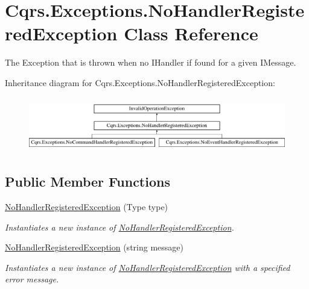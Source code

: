 \hypertarget{classCqrs_1_1Exceptions_1_1NoHandlerRegisteredException}{}\section{Cqrs.\+Exceptions.\+No\+Handler\+Registered\+Exception Class Reference}
\label{classCqrs_1_1Exceptions_1_1NoHandlerRegisteredException}


The Exception that is thrown when no I\+Handler if found for a given I\+Message.  


Inheritance diagram for Cqrs.\+Exceptions.\+No\+Handler\+Registered\+Exception\+:\begin{figure}[H]
\begin{center}
\leavevmode
\includegraphics[height=2.427746cm]{classCqrs_1_1Exceptions_1_1NoHandlerRegisteredException}
\end{center}
\end{figure}
\subsection*{Public Member Functions}
\begin{DoxyCompactItemize}
\item 
\hyperlink{classCqrs_1_1Exceptions_1_1NoHandlerRegisteredException_a573a57a3de0f1f63adc8709708aa94ff_a573a57a3de0f1f63adc8709708aa94ff}{No\+Handler\+Registered\+Exception} (Type type)
\begin{DoxyCompactList}\small\item\em Instantiates a new instance of \hyperlink{classCqrs_1_1Exceptions_1_1NoHandlerRegisteredException}{No\+Handler\+Registered\+Exception}. \end{DoxyCompactList}\item 
\hyperlink{classCqrs_1_1Exceptions_1_1NoHandlerRegisteredException_afe0d2f28155653fd69e4c295c94daf64_afe0d2f28155653fd69e4c295c94daf64}{No\+Handler\+Registered\+Exception} (string message)
\begin{DoxyCompactList}\small\item\em Instantiates a new instance of \hyperlink{classCqrs_1_1Exceptions_1_1NoHandlerRegisteredException}{No\+Handler\+Registered\+Exception} with a specified error message. \end{DoxyCompactList}\end{DoxyCompactItemize}


